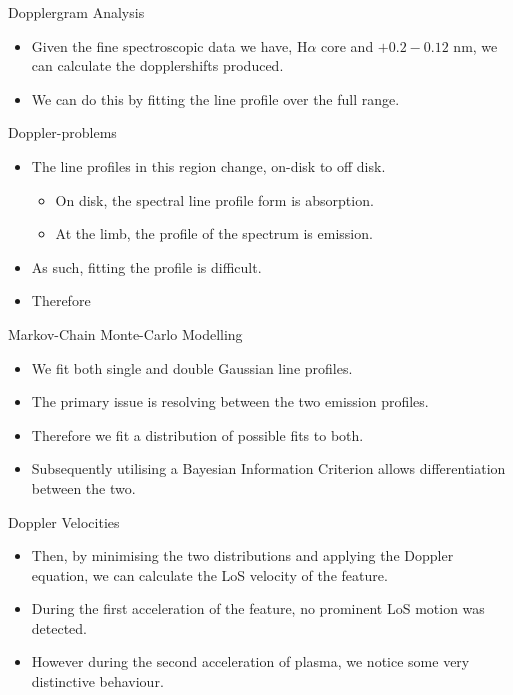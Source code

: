 \documentclass{beamer}
\begin{document}
	\begin{frame}{Dopplergram Analysis}
		\begin{itemize}
			\item{Given the fine spectroscopic data we have, H$\alpha$ core and $+0.2 -0.12$ nm, we can calculate the dopplershifts produced.}
			\item{We can do this by fitting the line profile over the full range.}
		\end{itemize}
	\end{frame}
	

	\begin{frame}{Doppler-problems}
		\begin{itemize}
			\item{The line profiles in this region change, on-disk to off disk.}
			\begin{itemize}
				\item{On disk, the spectral line profile form is absorption.}
				\item{At the limb, the profile of the spectrum is emission.}
			\end{itemize}
			\item{As such, fitting the profile is difficult.}
			\item{Therefore}
		\end{itemize}
	\end{frame}
	
	
	
	\begin{frame}{Markov-Chain Monte-Carlo Modelling}
		\begin{itemize}
			\item{We fit both single and double Gaussian line profiles.}
			\item{The primary issue is resolving between the two emission profiles.}
			\item{Therefore we fit a distribution of possible fits to both.}
			\item{Subsequently utilising a Bayesian Information Criterion allows differentiation between the two.}
		\end{itemize}
	\end{frame}

	\begin{frame}{Doppler Velocities}
		\begin{itemize}
			\item{Then, by minimising the two distributions and applying the Doppler equation, we can calculate the LoS velocity of the feature.}
			\item{During the first acceleration of the feature, no prominent LoS motion was detected.}
			\item{However during the second acceleration of plasma, we notice some very distinctive behaviour.}
		\end{itemize}
	\end{frame}
\end{document}
